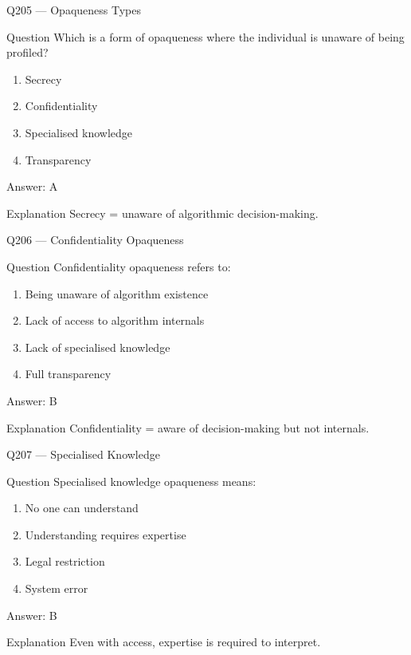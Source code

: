 \documentclass[aspectratio=169,8pt]{beamer}
\begin{document}
\begin{frame}{Q205 --- Opaqueness Types}
\begin{block}{Question}
Which is a form of opaqueness where the individual is unaware of being profiled?
\begin{enumerate}
\item Secrecy
\item Confidentiality
\item Specialised knowledge
\item Transparency
\end{enumerate}
\end{block}
\begin{exampleblock}{Answer: A}\end{exampleblock}
\begin{block}{Explanation}
Secrecy = unaware of algorithmic decision-making.
\end{block}
\end{frame}

\begin{frame}{Q206 --- Confidentiality Opaqueness}
\begin{block}{Question}
Confidentiality opaqueness refers to:
\begin{enumerate}
\item Being unaware of algorithm existence
\item Lack of access to algorithm internals
\item Lack of specialised knowledge
\item Full transparency
\end{enumerate}
\end{block}
\begin{exampleblock}{Answer: B}\end{exampleblock}
\begin{block}{Explanation}
Confidentiality = aware of decision-making but not internals.
\end{block}
\end{frame}

\begin{frame}{Q207 --- Specialised Knowledge}
\begin{block}{Question}
Specialised knowledge opaqueness means:
\begin{enumerate}
\item No one can understand
\item Understanding requires expertise
\item Legal restriction
\item System error
\end{enumerate}
\end{block}
\begin{exampleblock}{Answer: B}\end{exampleblock}
\begin{block}{Explanation}
Even with access, expertise is required to interpret.
\end{block}
\end{frame}
\end{document}

